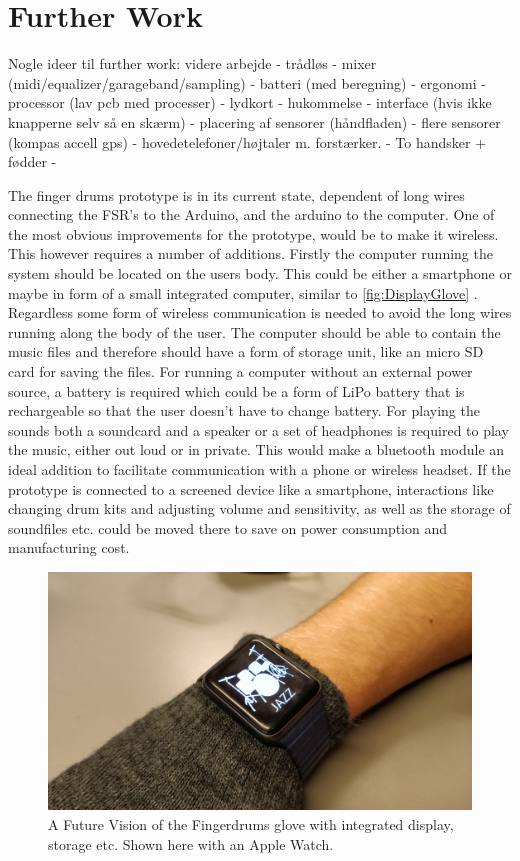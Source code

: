 \chapter{Further Work}
\label{further_work}
Nogle ideer til further work:
videre arbejde - trådløs - mixer (midi/equalizer/garageband/sampling) - batteri (med beregning) - ergonomi -  processor (lav pcb med processer) - lydkort - hukommelse - interface (hvis ikke knapperne selv så en skærm) - placering af sensorer (håndfladen) - flere sensorer (kompas accell gps) - hovedetelefoner/højtaler m. forstærker. - To handsker + fødder -    

The finger drums prototype is in its current state, dependent of long wires connecting the FSR's to the Arduino, and the arduino to the computer. One of the most obvious improvements for the prototype, would be to make it wireless. This however requires a number of additions. Firstly the computer running the system should be located on the users body. This could be either a smartphone or maybe in form of a small integrated computer, similar to \autoref{fig:DisplayGlove} . Regardless some form of wireless communication is needed to avoid the long wires running along the body of the user. The computer should be able to contain the music files and therefore should have a form of storage unit, like an micro SD card for saving the files. For running a computer without an external power source, a battery is required which could be a form of LiPo battery that is rechargeable so that the user doesn't have to change battery. For playing the sounds both a soundcard and a speaker or a set of headphones is required to play the music, either out loud or in private. This would make a bluetooth module an ideal addition to facilitate communication with a phone or wireless headset.
If the prototype is connected to a screened device like a smartphone, interactions like changing drum kits and adjusting volume and sensitivity, as well as the storage of soundfiles etc. could be moved there to save on power consumption and manufacturing cost.

\begin{figure}[H]
\centering
\includegraphics[scale=0.05]{Figure/Billeder/DisplayGlove.jpg}
\caption{A Future Vision of the Fingerdrums glove with integrated display, storage etc. Shown here with an Apple Watch.}
\label{fig:DisplayGlove}
\end{figure}

